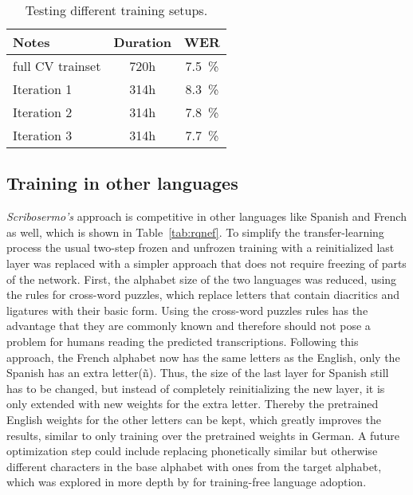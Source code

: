 \begin{table}[H]
	\caption{Testing different training setups.}
	\label{tab:tdts}
	\centering
	\begin{tabular}{lcc}
		\toprule
		\textbf{Notes}  & \textbf{Duration} & \textbf{WER} \\
		\midrule
		full CV trainset & 720h  & \SI{7.5}{\percent} \\
		\midrule
		Iteration 1 & 314h & \SI{8.3}{\percent} \\
		Iteration 2 & 314h & \SI{7.8}{\percent} \\
		Iteration 3 & 314h & \SI{7.7}{\percent} \\
		\bottomrule
	\end{tabular}
\end{table}

\subsection{Training in other languages}

\textit{Scribosermo's} approach is competitive in other languages like Spanish and French as well, which is shown in Table~\ref{tab:rqnef}. To simplify the transfer-learning process the usual two-step frozen and unfrozen training with a reinitialized last layer was replaced with a simpler approach that does not require freezing of parts of the network.
First, the alphabet size of the two languages was reduced, using the rules for cross-word puzzles, which replace letters that contain diacritics and ligatures with their basic form. Using the cross-word puzzles rules has the advantage that they are commonly known and therefore should not pose a problem for humans reading the predicted transcriptions. Following this approach, the French alphabet now has the same letters as the English, only the Spanish has an extra letter\;(ñ). Thus, the size of the last layer for Spanish still has to be changed, but instead of completely reinitializing the new layer, it is only extended with new weights for the extra letter. Thereby the pretrained English weights for the other letters can be kept, which greatly improves the results, similar to only training over the pretrained weights in German. A future optimization step could include replacing phonetically similar but otherwise different characters in the base alphabet with ones from the target alphabet, which was explored in more depth by \cite{ZRTCSW} for training-free language adoption.

